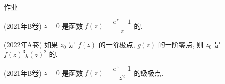 %
%
%
%
%

{
\homework
\begin{frame}[<*>]{作业}
  \begin{homeworks}
    \item(2021年B卷) $z=0$ 是函数 $f(z)=\dfrac{e^z-1}{z}$ 的\fillbrace.
    \item(2022年A卷) 如果 $z_0$ 是 $f(z)$ 的一阶极点, $g(z)$ 的一阶零点, 则 $z_0$ 是 $f(z)^3g(z)^2$ 的\fillbrace.
    \item(2021年B卷) $z=0$ 是函数 $f(z)=\dfrac{e^z-1}{z^2}$ 的\fillbrace 级极点.
  \end{homeworks}
\end{frame}
}



